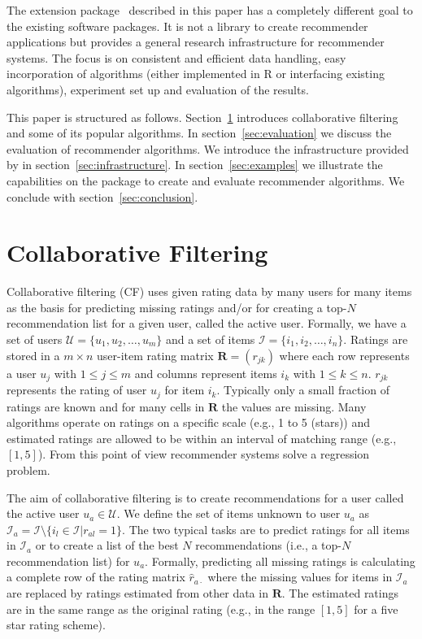 \documentclass[nojss]{jss}
\newcommand{\set}[1]{\mathcal{#1}}
\newcommand{\mat}[1]{{\mathbf{#1}}}
\begin{document}
The  extension package~
described in this paper
has a completely different goal to the existing software packages. It
is not a library to create recommender applications
but provides a general research infrastructure for recommender systems.
The focus is on consistent and efficient data handling,
easy incorporation of algorithms (either implemented in R or
interfacing existing algorithms),
experiment set up and evaluation of the results.

This paper is structured as follows. Section~\ref{sec:CF} introduces
collaborative filtering and
some of its popular algorithms.
In section~\ref{sec:evaluation} we discuss the evaluation of recommender
algorithms.
We introduce the infrastructure provided by 
in section~\ref{sec:infrastructure}. In section~\ref{sec:examples} we
illustrate the capabilities on the package to create and evaluate
recommender algorithms. We conclude with section~\ref{sec:conclusion}.

\section{Collaborative Filtering}
\label{sec:CF}

Collaborative filtering (CF) uses given rating data by many users for many
items as the basis for predicting missing ratings and/or for creating
a top-$N$ recommendation list for a given user, called the active user.
Formally, we have a set of
users $\set{U} = \{u_1, u_2, \ldots, u_m\}$ and a set of
items $\set{I} = \{i_1, i_2, \ldots, i_n\}$.
Ratings are stored in a $m \times n$ user-item rating matrix $\mat{R} = (r_{jk})$ where
each row represents a user $u_j$ with $1 \le j\le m$ and columns represent
items $i_k$ with $1 \le k\le n$. $r_{jk}$ represents the rating of user
$u_j$ for item $i_k$.
Typically only a small fraction of ratings are
known and for many cells in $\mat{R}$ the values are missing.
Many algorithms operate on ratings on a specific scale (e.g., 1 to 5 (stars))
and estimated ratings are allowed to be within an interval of matching range
(e.g., $[1,5]$). From this point of view recommender systems solve a regression
problem.

The aim of collaborative filtering is to create recommendations for a user
called the active user $u_a \in \set{U}$.
We define the set of items unknown to user $u_a$ as
$\set{I}_a = \set{I} \setminus \{i_l \in \set{I}| r_{al} = 1\}$.
The two typical tasks are to predict
ratings for all items in $\set{I}_a$ or to create a list of
the best $N$ recommendations
(i.e., a top-$N$ recommendation list) for
$u_a$.
Formally, predicting all missing ratings is calculating a complete row of the
rating matrix $\hat{r}_{a\cdot}$ where the missing values
for items in $\set{I}_a$
are replaced by ratings estimated from other data in $\mat{R}$.
The estimated ratings are in the same range as the original rating
(e.g., in the range $[1,5]$ for a five star rating scheme).
\end{document}
